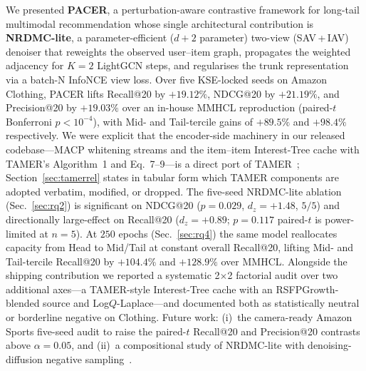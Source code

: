 \documentclass[conference]{IEEEtran}
\begin{document}
We presented \textbf{PACER}, a perturbation-aware contrastive
framework for long-tail multimodal recommendation whose single
architectural contribution is \textbf{NRDMC-lite}, a parameter-efficient
($d{+}2$ parameter) two-view (SAV\,+\,IAV) denoiser that reweights
the observed user--item graph, propagates the weighted adjacency for
$K{=}2$ LightGCN steps, and regularises the trunk representation via
a batch-N InfoNCE view loss. Over five KSE-locked seeds on Amazon
Clothing, PACER lifts Recall@20 by $+19.12\%$, NDCG@20 by $+21.19\%$,
and Precision@20 by $+19.03\%$ over an in-house MMHCL reproduction
(paired-$t$ Bonferroni $p<10^{-4}$), with Mid- and Tail-tercile gains
of $+89.5\%$ and $+98.4\%$ respectively. We were explicit that the
encoder-side machinery in our released codebase---MACP whitening
streams and the item--item Interest-Tree cache with TAMER's
Algorithm~1 and Eq.~7--9---is a direct port of
TAMER~\cite{meng2025tamer}; Section~\ref{sec:tamerrel} states in
tabular form which TAMER components are adopted verbatim, modified,
or dropped. The five-seed NRDMC-lite ablation (Sec.~\ref{sec:rq2}) is
significant on NDCG@20 ($p{=}0.029$, $d_{z}{=}+1.48$, $5/5$) and
directionally large-effect on Recall@20 ($d_{z}{=}+0.89$;
$p{=}0.117$ paired-$t$ is power-limited at $n{=}5$). At $250$
epochs (Sec.~\ref{sec:rq4}) the same model reallocates capacity
from Head to Mid/Tail at constant overall Recall@20, lifting
Mid- and Tail-tercile Recall@20 by $+104.4\%$ and $+128.9\%$ over
MMHCL. Alongside the shipping contribution we reported a
systematic 2$\times$2 factorial audit over two additional axes---a
TAMER-style Interest-Tree cache with an RSFPGrowth-blended source and
Log$Q$-Laplace---and documented both as statistically neutral or
borderline negative on Clothing. Future work: (i)~the
camera-ready Amazon Sports five-seed audit to raise the paired-$t$
Recall@20 and Precision@20 contrasts above $\alpha{=}0.05$, and
(ii)~a compositional study of NRDMC-lite with denoising-diffusion
negative sampling~\cite{nguyen2024diffusion}.



\end{document}
